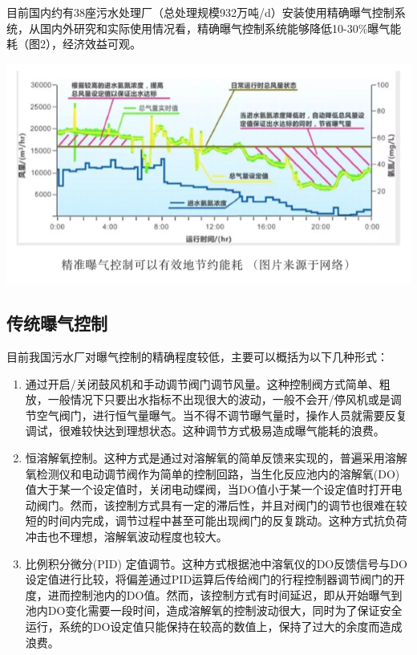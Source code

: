 \documentclass[]{book}
\begin{document}
目前国内约有38座污水处理厂（总处理规模932万吨/d）安装使用精确曝气控制系统，从国内外研究和实际使用情况看，精确曝气控制系统能够降低10-30\%曝气能耗（图2），经济效益可观。

\includegraphics[width=8.33in]{images/bq2}

\hypertarget{ux4f20ux7edfux66ddux6c14ux63a7ux5236}{%
\subsection{传统曝气控制}\label{ux4f20ux7edfux66ddux6c14ux63a7ux5236}}

目前我国污水厂对曝气控制的精确程度较低，主要可以概括为以下几种形式：

\begin{enumerate}
\def\labelenumi{(\arabic{enumi})}
\item
  通过开启/关闭鼓风机和手动调节阀门调节风量。这种控制阀方式简单、粗放，一般情况下只要出水指标不出现很大的波动，一般不会开/停风机或是调节空气阀门，进行恒气量曝气。当不得不调节曝气量时，操作人员就需要反复调试，很难较快达到理想状态。这种调节方式极易造成曝气能耗的浪费。
\item
  恒溶解氧控制。这种方式是通过对溶解氧的简单反馈来实现的，普遍采用溶解氧检测仪和电动调节阀作为简单的控制回路，当生化反应池内的溶解氧(DO)值大于某一个设定值时，关闭电动蝶阀，当DO值小于某一个设定值时打开电动阀门。然而，该控制方式具有一定的滞后性，并且对阀门的调节也很难在较短的时间内完成，调节过程中甚至可能出现阀门的反复跳动。这种方式抗负荷冲击也不理想，溶解氧波动程度也较大。
\item
  比例积分微分(PID) 定值调节。这种方式根据池中溶氧仪的DO反馈信号与DO设定值进行比较，将偏差通过PID运算后传给阀门的行程控制器调节阀门的开度，进而控制池内的DO值。然而，该控制方式有时间延迟，即从开始曝气到池内DO变化需要一段时间，造成溶解氧的控制波动很大，同时为了保证安全运行，系统的DO设定值只能保持在较高的数值上，保持了过大的余度而造成浪费。
\end{enumerate}
\end{document}
